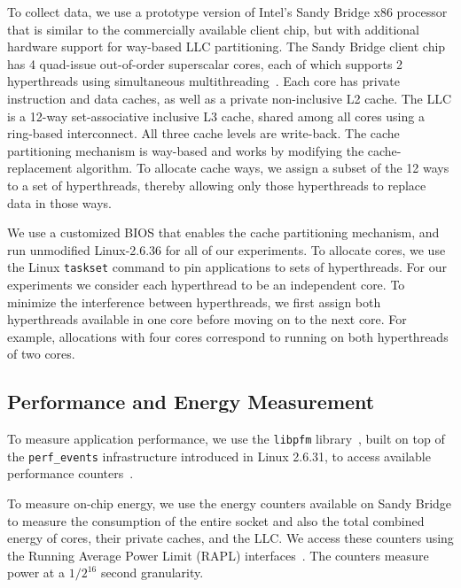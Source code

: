To collect data, we use a prototype version of Intel's Sandy Bridge x86 processor that is similar to the
commercially available client chip, but with additional hardware
support for way-based LLC partitioning.
The Sandy Bridge client chip has 4 quad-issue out-of-order
superscalar cores, each of which supports 2 hyperthreads using
simultaneous multithreading~\cite{IntelRefManual:2011}.  Each core has
private  instruction and data caches, as well as a
 private non-inclusive L2 cache.  The LLC is a 12-way
set-associative  inclusive L3 cache, shared among all
cores using a ring-based interconnect.  All three cache levels are
write-back.   The cache partitioning mechanism is way-based and works by modifying the
cache-replacement algorithm.  To allocate cache ways, we assign a subset of
the 12 ways to a set of hyperthreads, thereby allowing only those hyperthreads to replace data in those ways.


We use a customized BIOS that enables the cache partitioning
mechanism, and run unmodified Linux-2.6.36 for all of our experiments.
To allocate cores, we use the Linux {\tt taskset} command to pin applications to
sets of hyperthreads.  For our experiments we consider each hyperthread to be an independent core. To minimize the interference between hyperthreads, we first assign both hyperthreads available in one core before moving on to the next core. For example, allocations with four cores correspond to running on both hyperthreads of two cores.

\subsection*{Performance and Energy Measurement}

To measure application performance, we use the \texttt{libpfm}
library~\cite{Eranian:OLS06,Perfmon2}, built on top of the
\texttt{perf\_events} infrastructure introduced in Linux 2.6.31, to
access available performance counters~\cite{Intel:Manual2012}.

To measure on-chip energy, we use the energy counters available on
Sandy Bridge to measure the consumption of  the entire socket and also
the total combined energy of cores, their private caches, and the
LLC. We access these counters using the Running Average Power Limit
(RAPL) interfaces~\cite{Intel:Manual2012}.  The counters measure power
at a $1/2^{16}$ second granularity.

